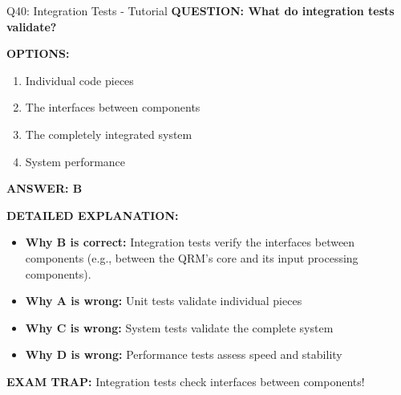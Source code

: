 \documentclass[8pt]{beamer}
\begin{document}
	\begin{frame}{Q40: Integration Tests - Tutorial}
		\fontsize{6.5}{7.5}\selectfont
		\textbf{QUESTION: What do integration tests validate?}
		
		\vspace{0.1cm}
		\textbf{OPTIONS:}
		\begin{enumerate}
			\item Individual code pieces
			\item The interfaces between components
			\item The completely integrated system
			\item System performance
		\end{enumerate}
		
		\vspace{0.1cm}
		\textcolor{myblue}{\textbf{ANSWER: B}}
		
		\vspace{0.1cm}
		\textbf{DETAILED EXPLANATION:}
		\begin{itemize}
			\item \textbf{Why B is correct:} Integration tests verify the interfaces between components (e.g., between the QRM's core and its input processing components).
			\item \textbf{Why A is wrong:} Unit tests validate individual pieces
			\item \textbf{Why C is wrong:} System tests validate the complete system
			\item \textbf{Why D is wrong:} Performance tests assess speed and stability
		\end{itemize}
		
		\textcolor{myred}{\textbf{EXAM TRAP:}} Integration tests check \textcolor{myblue}{interfaces between components}!
	\end{frame}
	
\end{document}
